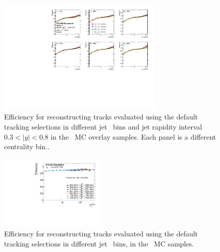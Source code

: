 \begin{figure}
\centering
\includegraphics[width=0.7\textwidth]{figures/main/corrections/eff_centrality_jetpt_jety1_ppTight.pdf}
\caption{Efficiency for reconstructing tracks evaluated using the default tracking selections in different jet \pT\ bins and jet rapidity interval $0.3<|y|<0.8$ in the \pbpb\ MC overlay samples.
Each panel is a different centrality bin..}
\label{fig:pbpbeffdefaultjetpt_y1}
\end{figure}

\begin{figure}
\centering
\includegraphics[width=0.45\textwidth]{figures/main/corrections/Trk_eff_v_pt_r005f_Tight_mcprob0p3_CX_Injet_0p0_0p3_pp_5p02.pdf}
\caption{Efficiency for reconstructing tracks evaluated using the default tracking selections in different jet \pT\ bins, in the \pp\ MC samples.}
\label{fig:ppeffdefaultjetpt}
\end{figure}

